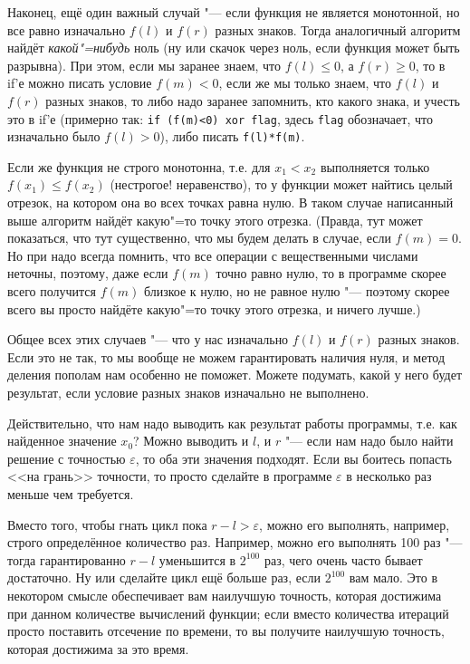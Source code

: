 \documentclass[a4paper,10pt]{problems}
\let\eps\varepsilon
\begin{document}
Наконец, ещё один важный случай "--- если функция не является монотонной, но все равно изначально $f(l)$ и $f(r)$ разных знаков. 
Тогда аналогичный алгоритм найдёт \textit{какой"=нибудь} ноль (ну или скачок через ноль, если функция может быть разрывна).
При этом, если мы заранее знаем, что $f(l)\leq 0$, а $f(r)\geq 0$, то в if'е можно писать условие $f(m)<0$, 
если же мы только знаем, что $f(l)$ и $f(r)$ разных знаков, то либо надо заранее запомнить, кто какого знака, 
и учесть это в if'е (примерно так: \verb`if (f(m)<0) xor flag`, здесь \verb`flag` обозначает, что изначально было $f(l)>0$), 
либо писать \verb`f(l)*f(m)`.

Если же функция не строго монотонна, т.е. для $x_1<x_2$ выполняется только $f(x_1)\leq f(x_2)$ 
(нестрогое! неравенство), то у функции может найтись целый отрезок, на котором она во всех точках равна нулю.
В таком случае написанный выше алгоритм найдёт какую"=то точку этого отрезка.
(Правда, тут может показаться, что тут существенно, что мы будем делать в случае, если $f(m)=0$. 
Но при надо всегда помнить, что все операции с вещественными числами неточны, поэтому, даже если $f(m)$ точно равно нулю,
то в программе скорее всего получится $f(m)$ близкое к нулю, но не равное нулю
"--- поэтому скорее всего вы просто найдёте какую"=то точку этого отрезка, и ничего лучше.)

Общее всех этих случаев "--- что у нас изначально $f(l)$ и $f(r)$ разных знаков. 
Если это не так, то мы вообще не можем гарантировать наличия нуля, и метод деления пополам нам особенно не поможет.
Можете подумать, какой у него будет результат, если условие разных знаков изначально не выполнено.

 Действительно, что нам надо выводить как результат работы программы, т.е. как найденное значение $x_0$?
Можно выводить и $l$, и $r$ "--- если нам надо было найти решение с точностью $\eps$, то оба эти значения подходят.
Если вы боитесь попасть <<на грань>> точности, то просто сделайте в программе $\eps$ в несколько раз меньше чем требуется.


\lheader{Решение без $\eps$} Вместо того, чтобы гнать цикл пока $r-l>\eps$, можно его выполнять, например, строго определённое количество раз.
Например, можно его выполнять 100 раз "--- тогда гарантированно $r-l$ уменьшится в $2^{100}$ раз, чего очень часто бывает достаточно.
Ну или сделайте цикл ещё больше раз, если $2^{100}$ вам мало. 
Это в некотором смысле обеспечивает вам наилучшую точность, которая достижима при данном количестве вычислений функции;
если вместо количества итераций просто поставить отсечение по времени, то вы получите наилучшую точность, которая достижима за это время.
\end{document}
